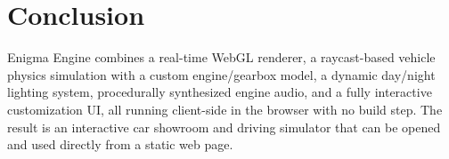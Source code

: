 \documentclass[11pt]{article}
\begin{document}
\section{Conclusion}
Enigma Engine combines a real-time WebGL renderer, a raycast-based vehicle
physics simulation with a custom engine/gearbox model, a dynamic day/night
lighting system, procedurally synthesized engine audio, and a fully
interactive customization UI, all running client-side in the browser with
no build step. The result is an interactive car showroom and driving
simulator that can be opened and used directly from a static web page.
\end{document}
